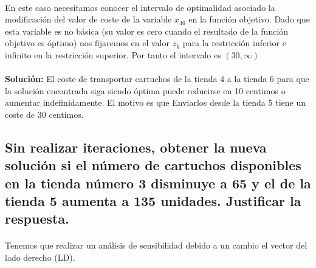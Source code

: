 \documentclass[10pt, a4paper]{article}
\begin{document}
			\paragraph{}
			En este caso necesitamos conocer el intervalo de optimalidad asociado la modificación del valor de coste de la variable \(x_{46}\) en la función objetivo. Dado que esta variable es no básica (su valor es cero cuando el resultado de la función objetivo es óptimo) nos fijaremos en el valor \(z_{k}\) para la restricción inferior e infinito en la restricción superior. Por tanto el intervalo es \((30,\infty)\)

			\paragraph{}
			\textbf{Solución:} El coste de transportar cartuchos de la tienda 4 a la tienda 6 para que la solución encontrada siga siendo óptima puede reducirse en 10 centimos o aumentar indefinidamente. El motivo es que Enviarlos desde la tienda 5 tiene un coste de 30 centimos.


		\subsection{Sin realizar iteraciones, obtener la nueva solución si el número de cartuchos disponibles en la tienda número 3 disminuye a 65 y el de la tienda 5 aumenta a 135 unidades. Justificar la respuesta.}

			\paragraph{}
			Tenemos que realizar un análisis de sensibilidad debido a un cambio el vector del lado derecho (LD).
\end{document}
